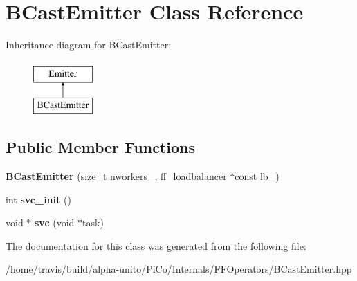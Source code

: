 \hypertarget{class_b_cast_emitter}{\section{\-B\-Cast\-Emitter \-Class \-Reference}
\label{class_b_cast_emitter}
}
\-Inheritance diagram for \-B\-Cast\-Emitter\-:\begin{figure}[H]
\begin{center}
\leavevmode
\includegraphics[height=2.000000cm]{class_b_cast_emitter}
\end{center}
\end{figure}
\subsection*{\-Public \-Member \-Functions}
\begin{DoxyCompactItemize}
\item 
\hypertarget{class_b_cast_emitter_a5d3a78dd06434eebf4ba82b00c1f358e}{{\bfseries \-B\-Cast\-Emitter} (size\-\_\-t nworkers\-\_\-, ff\-\_\-loadbalancer $\ast$const lb\-\_\-)}\label{class_b_cast_emitter_a5d3a78dd06434eebf4ba82b00c1f358e}

\item 
\hypertarget{class_b_cast_emitter_a48f1046a055b0d46ad9ebf551030dd23}{int {\bfseries svc\-\_\-init} ()}\label{class_b_cast_emitter_a48f1046a055b0d46ad9ebf551030dd23}

\item 
\hypertarget{class_b_cast_emitter_a771ab4e6eade9c5fa5c304b8c03256c3}{void $\ast$ {\bfseries svc} (void $\ast$task)}\label{class_b_cast_emitter_a771ab4e6eade9c5fa5c304b8c03256c3}

\end{DoxyCompactItemize}


\-The documentation for this class was generated from the following file\-:\begin{DoxyCompactItemize}
\item 
/home/travis/build/alpha-\/unito/\-Pi\-Co/\-Internals/\-F\-F\-Operators/\-B\-Cast\-Emitter.\-hpp\end{DoxyCompactItemize}
